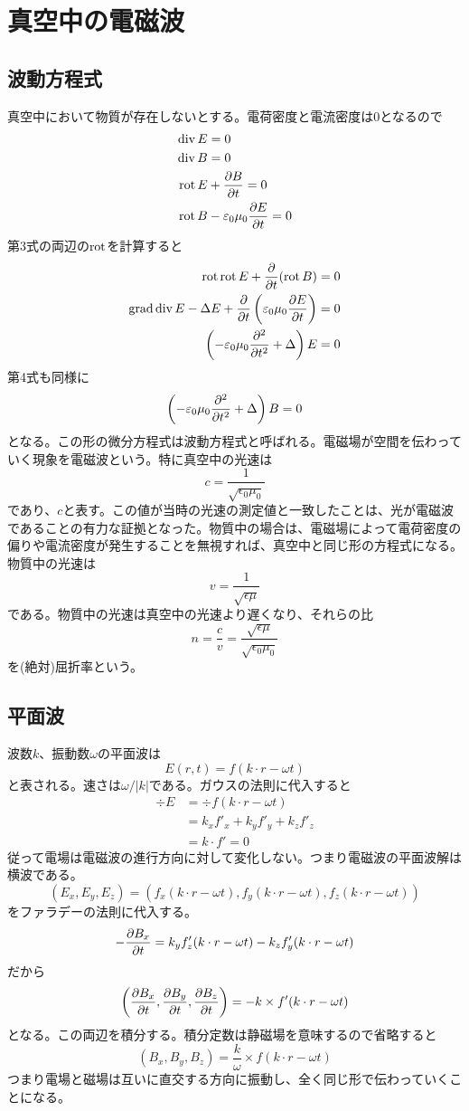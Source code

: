 \section{真空中の電磁波}

\subsection{波動方程式}
    真空中において物質が存在しないとする。電荷密度と電流密度は0となるので
    \begin{align*}
        \operatorname{div} E &= 0\\
        \operatorname{div} B &= 0\\
        \operatorname{rot} E &+ \pdv{B}{t} = 0\\
        \operatorname{rot} B &- \varepsilon_0\mu_0\pdv{E}{t} = 0
    \end{align*}
    第3式の両辺の$\operatorname{rot}$を計算すると
    \begin{align*}
        \operatorname{rot}\operatorname{rot} E + \pdv{t}(\operatorname{rot} B) &= 0\\
        \operatorname{grad}\operatorname{div} E - \Delta E + \pdv{t}\left(\varepsilon_0\mu_0\pdv{E}{t}\right) &= 0\\
        \left(-\varepsilon_0\mu_0\pdv[2]{t} + \Delta\right)E &= 0
    \end{align*}
    第4式も同様に
        \[\left(-\varepsilon_0\mu_0\pdv[2]{t} + \Delta\right)B = 0\]
    となる。この形の微分方程式は波動方程式と呼ばれる。電磁場が空間を伝わっていく現象を電磁波という。特に真空中の光速は
        \[c = \frac{1}{\sqrt{\epsilon_0\mu_0}}\]
    であり、$c$と表す。この値が当時の光速の測定値と一致したことは、光が電磁波であることの有力な証拠となった。物質中の場合は、電磁場によって電荷密度の偏りや電流密度が発生することを無視すれば、真空中と同じ形の方程式になる。物質中の光速は
        \[v = \frac{1}{\sqrt{\epsilon\mu}}\]
    である。物質中の光速は真空中の光速より遅くなり、それらの比
        \[n = \frac{c}{v} = \frac{\sqrt{\epsilon\mu}}{\sqrt{\epsilon_0\mu_0}}\]
    を(絶対)屈折率という。

\subsection{平面波}
    波数$k$、振動数$\omega$の平面波は
        \[E(r, t) = f(k \cdot r - \omega t)\]
    と表される。速さは$\omega / |k|$である。ガウスの法則に代入すると
    \begin{align*}
        \div E
        &= \div f(k \cdot r - \omega t)\\
        &= k_xf'_x + k_yf'_y + k_zf'_z\\
        &= k \cdot f' = 0
    \end{align*}
    従って電場は電磁波の進行方向に対して変化しない。つまり電磁波の平面波解は横波である。
        \[(E_x, E_y, E_z) = (f_x(k \cdot r - \omega t), f_y(k \cdot r - \omega t), f_z(k \cdot r - \omega t))\]
    をファラデーの法則に代入する。
        \[-\pdv{B_x}{t} = k_yf_z'(k \cdot r - \omega t) - k_zf_y'(k \cdot r - \omega t)\]
    だから
        \[\left(\pdv{B_x}{t}, \pdv{B_y}{t}, \pdv{B_z}{t}\right) = -k \times f'(k \cdot r - \omega t)\]
    となる。この両辺を積分する。積分定数は静磁場を意味するので省略すると
        \[(B_x, B_y, B_z) = \frac{k}{\omega} \times f(k \cdot r - \omega t)\]
    つまり電場と磁場は互いに直交する方向に振動し、全く同じ形で伝わっていくことになる。

